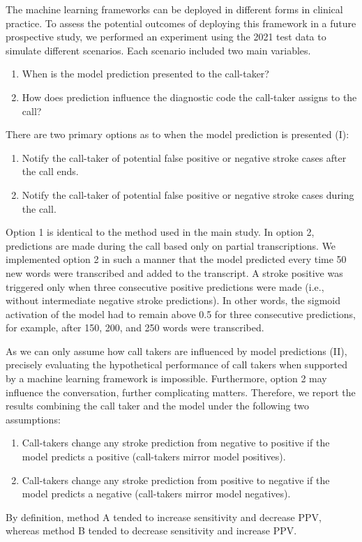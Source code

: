 {The machine learning frameworks can be deployed in different forms in clinical practice. To assess the potential outcomes of deploying this framework in a future prospective study, we performed an experiment using the 2021 test data to simulate different scenarios. Each scenario included two main variables.
%
\begin{enumerate}[label=\Roman*.]
    \item When is the model prediction presented to the call-taker?
    \item How does prediction influence the diagnostic code the call-taker assigns to the call?
\end{enumerate}
%
There are two primary options as to when the model prediction is presented (I):
%
\begin{enumerate}
    \item Notify the call-taker of potential false positive or negative stroke cases after the call ends.
    \item Notify the call-taker of potential false positive or negative stroke cases during the call.
\end{enumerate}
%
Option 1 is identical to the method used in the main study. In option 2, predictions are made during the call based only on partial transcriptions. We implemented option 2 in such a manner that the model predicted every time 50 new words were transcribed and added to the transcript. A stroke positive was triggered only when three consecutive positive predictions were made (i.e., without intermediate negative stroke predictions). In other words, the sigmoid activation of the model had to remain above 0.5 for three consecutive predictions, for example, after 150, 200, and 250 words were transcribed.

As we can only assume how call takers are influenced by model predictions (II), precisely evaluating the hypothetical performance of call takers when supported by a machine learning framework is impossible. Furthermore, option 2 may influence the conversation, further complicating matters. Therefore, we report the results combining the call taker and the model under the following two assumptions:
%
\begin{enumerate}[label=\Alph*.]
    \item Call-takers change any stroke prediction from negative to positive if the model predicts a positive (call-takers mirror model positives).
    \item Call-takers change any stroke prediction from positive to negative if the model predicts a negative (call-takers mirror model negatives).
\end{enumerate}
%
By definition, method A tended to increase sensitivity and decrease PPV, whereas method B tended to decrease sensitivity and increase PPV.

}
